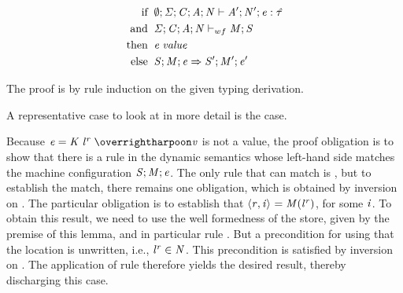 \begin{lemma}[Progress]
  \label{lemma:progress}
  \begin{displaymath}
  \begin{aligned}
  \text{if} \;\; & \emptyset;\mathit{\Sigma};\mathit{C};\mathit{A};\mathit{N} \vdash \mathit{A}';\mathit{N}';\mathit{e} : \mathit{\hat{\tau}} \\
  \text{and} \;\; & \mathit{\Sigma};\mathit{C};\mathit{A};\mathit{N} \vdash_{wf} \mathit{M};\mathit{S} \\
  \text{then} \;\; & \mathit{e} \; \mathit{value} \\
  \text{else} \;\; & \mathit{S};\mathit{M};\mathit{e} \Rightarrow \mathit{S}';\mathit{M}';\mathit{e}'
  \end{aligned}
  \end{displaymath}
\end{lemma}
\begin{nproof}
  The proof is by rule induction on the given typing derivation.

  A representative case to look at in more detail is the \tdatacon{} case.

    Because $\EXPR = \datacon{\DC}{\keywd{\locreg{\loc}{\reg}}}{\overharpoon{\VAL}}$ is not
    a value, the proof obligation is to show that there is a rule in the dynamic semantics whose
    left-hand side matches the machine configuration $\mathit{S};\mathit{M};\mathit{e}$.
    The only rule that can match is \ddatacon{}, but to establish the
    match, there remains one obligation, which is obtained
    by inversion on \ddatacon{}.
    The particular obligation is to establish that
    $\langle \mathit{r}, \mathit{i} \rangle ^{} = \mathit{M}({\mathit{l}}^{\mathit{r}})$,
    for some $\mathit{i}$.
    To obtain this result, we need to use the well formedness
    of the store, given by the premise of this lemma, and in particular rule
    .
    But a precondition for using
     that
    the location is unwritten, i.e., ${\mathit{l}}^{\mathit{r}} \in \mathit{N}$.
    This precondition is satisfied by inversion on \tdatacon{}.
    The application of rule 
    therefore yields the desired result, thereby discharging this case.




\end{nproof}
